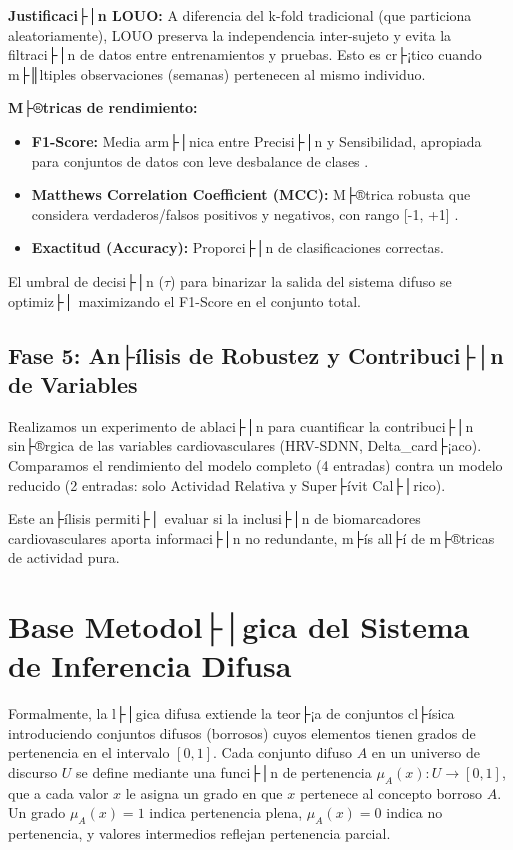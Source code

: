 \textbf{Justificaci├│n LOUO:} A diferencia del k-fold tradicional (que particiona aleatoriamente), LOUO preserva la independencia inter-sujeto y evita la filtraci├│n de datos entre entrenamientos y pruebas. Esto es cr├¡tico cuando m├║ltiples observaciones (semanas) pertenecen al mismo individuo.

\textbf{M├®tricas de rendimiento:}
\begin{itemize}
    \item \textbf{F1-Score:} Media arm├│nica entre Precisi├│n y Sensibilidad, apropiada para conjuntos de datos con leve desbalance de clases \cite{Sokolova2009}.
    \item \textbf{Matthews Correlation Coefficient (MCC):} M├®trica robusta que considera verdaderos/falsos positivos y negativos, con rango [-1, +1] \cite{Chicco2020}.
    \item \textbf{Exactitud (Accuracy):} Proporci├│n de clasificaciones correctas.
\end{itemize}

El umbral de decisi├│n ($\tau$) para binarizar la salida del sistema difuso se optimiz├│ maximizando el F1-Score en el conjunto total.

\subsection{Fase 5: An├ílisis de Robustez y Contribuci├│n de Variables}
\label{subsec:fase5_robustez}

Realizamos un experimento de ablaci├│n para cuantificar la contribuci├│n sin├®rgica de las variables cardiovasculares (HRV-SDNN, Delta\_card├¡aco). Comparamos el rendimiento del modelo completo (4 entradas) contra un modelo reducido (2 entradas: solo Actividad Relativa y Super├ívit Cal├│rico).

Este an├ílisis permiti├│ evaluar si la inclusi├│n de biomarcadores cardiovasculares aporta informaci├│n no redundante, m├ís all├í de m├®tricas de actividad pura.

\section{Base Metodol├│gica del Sistema de Inferencia Difusa}
\label{sec:base_metodologica_sistema_difuso}

Formalmente, la l├│gica difusa extiende la teor├¡a de conjuntos cl├ísica introduciendo conjuntos difusos (borrosos) cuyos elementos tienen grados de pertenencia en el intervalo $[0,1]$. Cada conjunto difuso $A$ en un universo de discurso $U$ se define mediante una funci├│n de pertenencia $\mu_A(x): U \rightarrow [0,1]$, que a cada valor $x$ le asigna un grado en que $x$ pertenece al concepto borroso $A$. Un grado $\mu_A(x) = 1$ indica pertenencia plena, $\mu_A(x) = 0$ indica no pertenencia, y valores intermedios reflejan pertenencia parcial.


